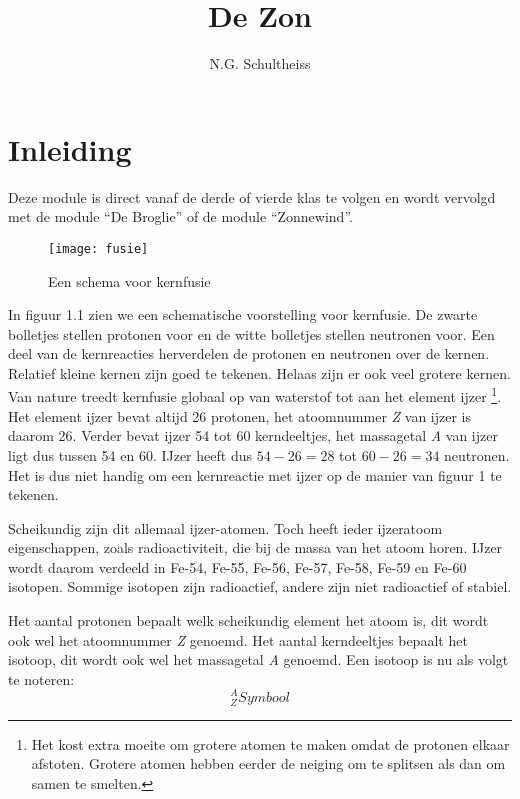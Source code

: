 



\title{De Zon}
\author{N.G. Schultheiss}
\date{}

\maketitle
\thispagestyle{firststyle}

\section{Inleiding}

Deze module is direct vanaf de derde of vierde klas te volgen en wordt
vervolgd met de module ``De Broglie'' of de module ``Zonnewind''.
\begin{figure}[H]
\noindent \begin{centering}
\texttt{[image: fusie]}
\par\end{centering}

\caption{Een schema voor kernfusie}
\end{figure}


In figuur 1.1 zien we een schematische voorstelling voor kernfusie. De
zwarte bolletjes stellen protonen voor en de witte bolletjes stellen
neutronen voor. Een deel van de kernreacties herverdelen de protonen en
neutronen over de kernen. Relatief kleine kernen zijn goed te tekenen.
Helaas zijn er ook veel grotere kernen. Van nature treedt kernfusie
globaal op van waterstof tot aan het element ijzer \footnote{Het kost
extra moeite om grotere atomen te maken omdat de protonen elkaar
afstoten. Grotere atomen hebben eerder de neiging om te splitsen als dan
om samen te smelten.}. Het element ijzer bevat altijd 26 protonen, het
atoomnummer \emph{Z} van ijzer is daarom 26. Verder bevat ijzer 54 tot
60 kerndeeltjes, het massagetal \emph{A} van ijzer ligt dus tussen 54 en
60. IJzer heeft dus $54-26=28$ tot $60-26=34$ neutronen. Het is dus niet
handig om een kernreactie met ijzer op de manier van figuur 1 te tekenen.

Scheikundig zijn dit allemaal ijzer-atomen. Toch heeft ieder ijzeratoom
eigenschappen, zoals radioactiviteit, die bij de massa van het atoom
horen. IJzer wordt daarom verdeeld in Fe-54, Fe-55, Fe-56, Fe-57,
Fe-58, Fe-59 en Fe-60 isotopen. Sommige isotopen zijn radioactief,
andere zijn niet radioactief of stabiel.

Het aantal protonen bepaalt welk scheikundig element het atoom is,
dit wordt ook wel het atoomnummer \emph{Z} genoemd. Het aantal kerndeeltjes
bepaalt het isotoop, dit wordt ook wel het massagetal \emph{A} genoemd.
Een isotoop is nu als volgt te noteren:
\[
_{Z}^{A}Symbool
\]


